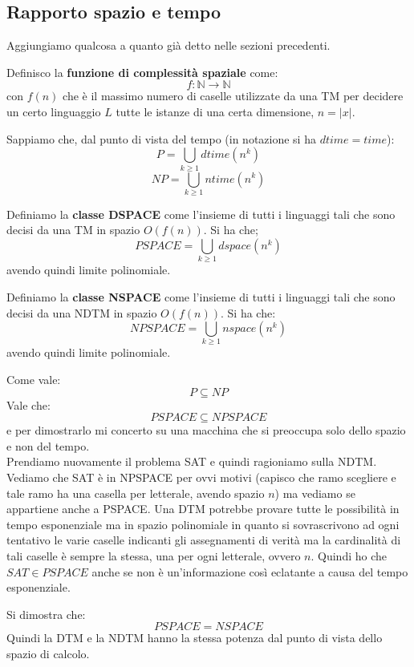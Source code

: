 \subsection{Rapporto spazio e tempo}
Aggiungiamo qualcosa a quanto già detto nelle sezioni precedenti.\\
\begin{definizione}
  Definisco la \textbf{funzione di complessità spaziale} come:
  \[f:\mathbb{N}\to\mathbb{N}\]
  con $f(n)$ che è il massimo numero di caselle utilizzate da una TM per
  decidere un certo linguaggio $L$ tutte le istanze di una certa dimensione,
  $n=|x|$. 
\end{definizione}
Sappiamo che, dal punto di vista del tempo (in notazione si ha $dtime=time$):
\[P=\bigcup_{k\geq 1}dtime(n^k)\]
\[NP=\bigcup_{k\geq 1}ntime(n^k)\]
\begin{definizione}
  Definiamo la \textbf{classe DSPACE} come l'insieme di tutti i linguaggi tali
  che sono decisi da una TM in spazio $O(f(n))$. Si ha che;
  \[PSPACE=\bigcup_{k\geq 1}dspace(n^k)\]
  avendo quindi limite polinomiale.
\end{definizione}
\begin{definizione}
  Definiamo la \textbf{classe NSPACE} come l'insieme di tutti i linguaggi tali
  che sono decisi da una NDTM in spazio $O(f(n))$. Si ha che:
  \[NPSPACE=\bigcup_{k\geq 1}nspace(n^k)\]
  avendo quindi limite polinomiale.
\end{definizione}
Come vale:
\[P\subseteq NP\]
Vale che:
\[PSPACE\subseteq NPSPACE\]
e per dimostrarlo mi concerto su una macchina che si preoccupa solo dello spazio
e non del tempo.\\
Prendiamo nuovamente il problema SAT e quindi ragioniamo sulla NDTM. Vediamo che
SAT è in NPSPACE per ovvi motivi (capisco che ramo scegliere e tale ramo ha una
casella per letterale, avendo spazio $n$) ma vediamo se appartiene anche a
PSPACE. Una DTM potrebbe provare tutte le possibilità in tempo esponenziale ma
in spazio polinomiale in quanto si sovrascrivono ad ogni tentativo le varie
caselle indicanti gli assegnamenti di verità ma la cardinalità di tali caselle è
sempre la stessa, una per ogni letterale, ovvero $n$. Quindi ho che $SAT\in
PSPACE$ anche se non è un'informazione così eclatante a causa del tempo
esponenziale.
\begin{definizione}
  Si dimostra che:
  \[PSPACE=NSPACE\]
  Quindi la DTM e la NDTM hanno la stessa potenza dal punto di vista dello
  spazio di calcolo.
\end{definizione}
